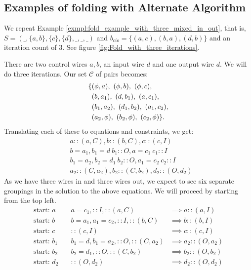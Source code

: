\subsection{Examples of folding with Alternate Algorithm} %
\label{sub:examples_of_folding_with_alternate_algorithm}
\begin{example}\label{exmpl:alternate_fold_example_with_three_mixed_in_out}
  We repeat Example \ref{exmpl:fold_example_with_three_mixed_in_out}, that is,
  $S=(\_,\{a,b\},\{c\},\{d\},\_,\_,\_)$ and $b_{cio}=\{(a,c),(b,a),(d,b)\}$
  and an iteration count of $3$. See figure
  \ref{fig:Fold_with_three_iterations}.
\end{example}
There are two control wires $a,b$, an input wire $d$ and one output
wire $d$. We  will do three iterations. Our set $\mathcal{C}$ of pairs
becomes:
\begin{align*}
  \{ & (\phi,a),\ (\phi,b),\ (\phi,c),\\
  & (b,a_1),\ (d,b_1),\ (a,c_1),\\
  & (b_1,a_2),\ (d_1,b_2),\ (a_1,c_2),\\
  & (a_2,\phi),\ (b_2,\phi),\ (c_2,\phi)\}.\\
\end{align*}
Translating each of these to equations and constraints, we get:
\begin{align*}
  &a::(a,C), b::(b,C), c::(c,I)\\
  &b=a_1, b_1=d\ b_1::O, a=c_1\ c_1::I\\
  &b_1=a_2, b_2=d_1\ b_2::O, a_1=c_2\ c_2::I\\
  &a_2::(C,a_2), b_2::(C,b_2), d_2::(O,d_2)
\end{align*}
As we have three wires in and three wires out, we expect to see six separate
groupings in the solution to the above equations. We will proceed by starting
from the top left.
\begin{align*}
  \text{start: }a &\quad a=c_1, ::I, ::(a,C) &\implies a::(a,I)\\
  \text{start: }b &\quad  b=a_1,a_1=c_2, ::I, ::(b,C) &\implies b::(b,I)\\
  \text{start: }c &\quad  ::(c,I) &\implies c::(c,I)\\
  \text{start: }b_1 &\quad  b_1=d, b_1=a_2, ::O, ::(C,a_2) &\implies
    a_2::(O,a_2)\\
  \text{start: }b_2 &\quad  b_2=d_1, ::O, ::(C,b_2) &\implies b_2::(O,b_2)\\
  \text{start: }d_2 &\quad  ::(O,d_2) &\implies d_2::(O,d_2)
\end{align*}

